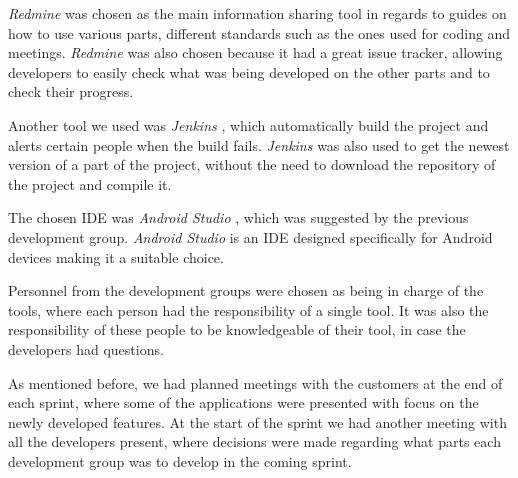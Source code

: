 \textit{Redmine} \citep{misc:redmine}  was chosen as the main information sharing tool in regards to guides on how to use various parts, different standards such as the ones used for coding and meetings.
\textit{Redmine} was also chosen because it had a great issue tracker, allowing developers to easily check what was being developed on the other parts and to check their progress.

Another tool we used was \textit{Jenkins} \citep{misc:jenkins}, which automatically build the project and alerts certain people when the build fails.
\textit{Jenkins} was also used to get the newest version of a part of the project, without the need to download the repository of the project and compile it.

The chosen IDE was \textit{Android Studio} \citep{misc:android-studio}, which was suggested by the previous development group. \textit{Android Studio} is an IDE designed specifically for Android devices making it a suitable choice.

Personnel from the development groups were chosen as being in charge of the tools, where each person had the responsibility of a single tool.
It was also the responsibility of these people to be knowledgeable of their tool, in case the developers had questions.

As mentioned before, we had planned meetings with the customers at the end of each sprint, where some of the applications were presented with focus on the newly developed features.
At the start of the sprint we had another meeting with all the developers present, where decisions were made regarding what parts each development group was to develop in the coming sprint.


